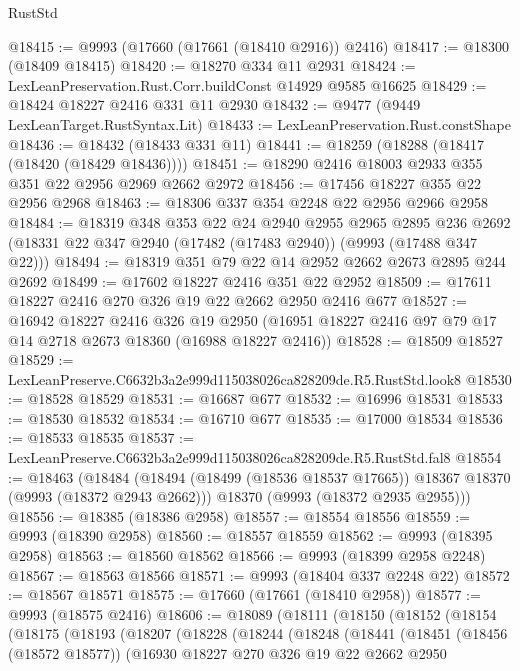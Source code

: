 \begin{lexlean}{RustStd}
\begin{coremodule}
@18415 := @9993 (@17660 (@17661 (@18410 @2916)) @2416)
@18417 := @18300 (@18409 @18415)
@18420 := @18270 @334 @11 @2931
@18424 := LexLeanPreservation.Rust.Corr.buildConst @14929 @9585 @16625
@18429 := @18424 @18227 @2416 @331 @11 @2930
@18432 := @9477 (@9449 LexLeanTarget.RustSyntax.Lit)
@18433 := LexLeanPreservation.Rust.constShape
@18436 := @18432 (@18433 @331 @11)
@18441 := @18259 (@18288 (@18417 (@18420 (@18429 @18436))))
@18451 := @18290 @2416 @18003 @2933 @355 @351 @22 @2956 @2969 @2662 @2972
@18456 := @17456 @18227 @355 @22 @2956 @2968
@18463 := @18306 @337 @354 @2248 @22 @2956 @2966 @2958
@18484 := @18319
    @348
    @353
    @22
    @24
    @2940
    @2955
    @2965
    @2895
    @236
    @2692
    (@18331 @22 @347 @2940 (@17482 (@17483 @2940)) (@9993 (@17488 @347 @22)))
@18494 := @18319 @351 @79 @22 @14 @2952 @2662 @2673 @2895 @244 @2692
@18499 := @17602 @18227 @2416 @351 @22 @2952
@18509 := @17611 @18227 @2416 @270 @326 @19 @22 @2662 @2950 @2416 @677
@18527 := @16942
    @18227
    @2416
    @326
    @19
    @2950
    (@16951 @18227 @2416 @97 @79 @17 @14 @2718 @2673 @18360 (@16988 @18227 @2416))
@18528 := @18509 @18527
@18529 := LexLeanPreserve.C6632b3a2e999d115038026ca828209de.R5.RustStd.look8
@18530 := @18528 @18529
@18531 := @16687 @677
@18532 := @16996 @18531
@18533 := @18530 @18532
@18534 := @16710 @677
@18535 := @17000 @18534
@18536 := @18533 @18535
@18537 := LexLeanPreserve.C6632b3a2e999d115038026ca828209de.R5.RustStd.fal8
@18554 := @18463
    (@18484
      (@18494 (@18499 (@18536 @18537 @17665)) @18367 @18370 (@9993 (@18372 @2943 @2662)))
      @18370
      (@9993 (@18372 @2935 @2955)))
@18556 := @18385 (@18386 @2958)
@18557 := @18554 @18556
@18559 := @9993 (@18390 @2958)
@18560 := @18557 @18559
@18562 := @9993 (@18395 @2958)
@18563 := @18560 @18562
@18566 := @9993 (@18399 @2958 @2248)
@18567 := @18563 @18566
@18571 := @9993 (@18404 @337 @2248 @22)
@18572 := @18567 @18571
@18575 := @17660 (@17661 (@18410 @2958))
@18577 := @9993 (@18575 @2416)
@18606 := @18089
    (@18111
      (@18150
        (@18152
          (@18154
            (@18175
              (@18193
                (@18207
                  (@18228
                    (@18244
                      (@18248
                        (@18441
                          (@18451
                            (@18456 (@18572 @18577))
                            (@16930
                              @18227
                              @270
                              @326
                              @19
                              @22
                              @2662
                              @2950

\end{coremodule}
\end{lexlean}
